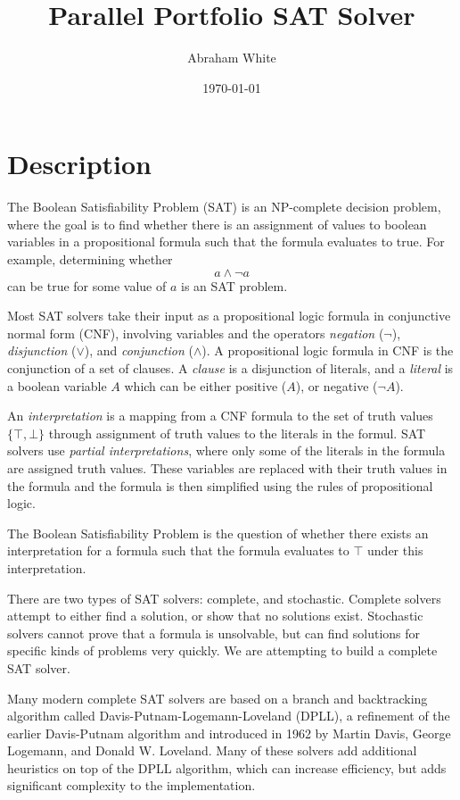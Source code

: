 \documentclass[10pt,AMS Euler]{article}
\author{Abraham White}
\date{\today}
\title{Parallel Portfolio SAT Solver}
\begin{document}
\maketitle
\tableofcontents

\section{Description}
\label{sec:orgd84ee01}
The Boolean Satisfiability Problem (SAT) is an NP-complete decision problem,
where the goal is to find whether there is an assignment of values to boolean variables
in a propositional formula such that the formula evaluates to true. For example,
determining whether \[ a \land \neg a \] can be true for some value of \(a\) is
an SAT problem.

Most SAT solvers take their input as a propositional logic formula in conjunctive normal form (CNF),
involving variables and the operators \emph{negation} (\(\neg\)), \emph{disjunction} (\(\lor\)), and \emph{conjunction} (\(\land\)). A
propositional logic formula in CNF is the conjunction of a set of clauses. A \emph{clause} is a disjunction
of literals, and a \emph{literal} is a boolean variable \(A\) which can be either positive (\(A\)), or negative (\(\neg A\)).

An \emph{interpretation} is a mapping from a CNF formula to the set of truth values \(\{\top,\bot\}\) through assignment
of truth values to the literals in the formul. SAT solvers use \emph{partial interpretations}, where only some of the
literals in the formula are assigned truth values. These variables are replaced with their truth values in
the formula and the formula is then simplified using the rules of propositional logic.

The Boolean Satisfiability Problem is the question of whether there exists an interpretation for a formula such
that the formula evaluates to \(\top\) under this interpretation.

There are two types of SAT solvers: complete, and stochastic. Complete solvers attempt to
either find a solution, or show that no solutions exist. Stochastic solvers cannot prove
that a formula is unsolvable, but can find solutions for specific kinds of problems very
quickly. We are attempting to build a complete SAT solver.

Many modern complete SAT solvers are based on a branch and backtracking algorithm called
Davis-Putnam-Logemann-Loveland (DPLL), a refinement of the earlier Davis-Putnam algorithm and 
introduced in 1962 by Martin Davis, George Logemann, and Donald W. Loveland. Many of these solvers
add additional heuristics on top of the DPLL algorithm, which can increase efficiency, but adds significant
complexity to the implementation.
\end{document}
